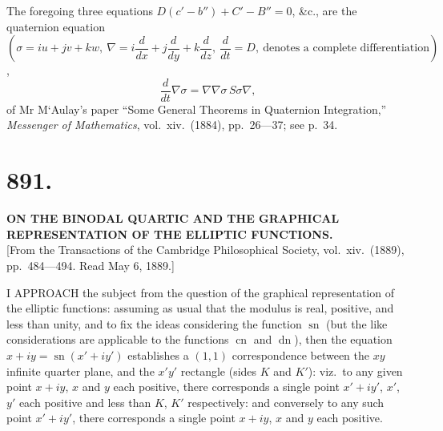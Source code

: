 \documentclass[11pt,a4paper]{article}
\DeclareMathOperator{\sn}{sn}
\DeclareMathOperator{\cn}{cn}
\DeclareMathOperator{\dn}{dn}
\begin{document}
The foregoing three equations $D(c' - b'') + C' - B'' = 0$, \&c., are the quaternion equation $\left(\sigma = iu + jv + kw,\ \nabla = i\dfrac{d}{dx} + j\dfrac{d}{dy} + k\dfrac{d}{dz},\ \dfrac{d}{dt} = D,\ \text{denotes a complete differentiation}\right)$,
\[
\frac{d}{dt}\nabla\sigma = \nabla\nabla\sigma\,S\sigma\nabla,
\]
of Mr M`Aulay's paper ``Some General Theorems in Quaternion Integration,'' \emph{Messenger of Mathematics}, vol.\ xiv.\ (1884), pp.\ 26---37; see p.\ 34.


\section*{891.}
\begin{center}
{\large\bfseries ON THE BINODAL QUARTIC AND THE GRAPHICAL REPRESENTATION OF THE ELLIPTIC FUNCTIONS.}\\[0.5em]
\small [From the Transactions of the Cambridge Philosophical Society, vol.\ xiv.\ (1889), pp.\ 484---494. Read May 6, 1889.]
\end{center}

I APPROACH the subject from the question of the graphical representation of the elliptic functions: assuming as usual that the modulus is real, positive, and less than unity, and to fix the ideas considering the function $\sn$ (but the like considerations are applicable to the functions $\cn$ and $\dn$), then the equation $x + iy = \sn(x' + iy')$ establishes a $(1, 1)$ correspondence between the $xy$ infinite quarter plane, and the $x'y'$ rectangle (sides $K$ and $K'$): viz.\ to any given point $x + iy$, $x$ and $y$ each positive, there corresponds a single point $x' + iy'$, $x'$, $y'$ each positive and less than $K$, $K'$ respectively: and conversely to any such point $x' + iy'$, there corresponds a single point $x + iy$, $x$ and $y$ each positive.
\end{document}

